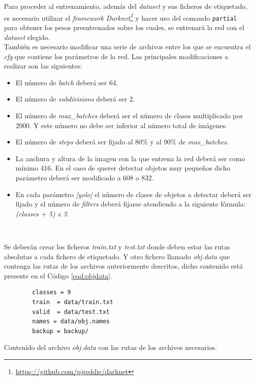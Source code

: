 Para proceder al entrenamiento, además del \textit{dataset} y sus ficheros de etiquetado, es necesario utilizar el \textit{framework} \textit{Darknet\footnote{\url{https://github.com/pjreddie/darknet}}} y hacer uso del comando \verb|partial| para obtener los pesos preentrenados sobre los cuales, se entrenará la red con el \textit{dataset} elegido.\\

También es necesario modificar una serie de archivos entre los que se encuentra el \textit{cfg} que contiene los parámetros de la red. Las principales modificaciones a realizar son las siguientes:
\begin{itemize}
	\item El número de \textit{batch} deberá ser 64.
	\item El número de \textit{subdivisions} deberá ser 2.
	\item El número de \textit{max\_batches} deberá ser el número de clases multiplicado por 2000. Y este número no debe ser inferior al número total de imágenes.
	\item El número de \textit{steps} deberá ser fijado al 80\% y al 90\% de \textit{max\_batches}.
	\item La anchura y altura de la imagen con la que entrena la red deberá ser como mínimo 416. En el caso de querer detectar objetos muy pequeños dicho parámetro deberá ser modificado a 608 o 832.
	\item En cada parámetro \textit{[yolo]} el número de clases de objetos a detectar deberá ser fijado y el número de \textit{filters} deberá fijarse atendiendo a la siguiente fórmula: \textit{(classes + 5) x 3}.
\end{itemize}\

Se deberán crear los ficheros \textit{train.txt} y \textit{test.txt} donde deben estar las rutas absolutas a cada fichero de etiquetado. Y otro fichero llamado \textit{obj.data} que contenga las rutas de los archivos anteriormente descritos, dicho contenido está presente en el Código \ref{cod:objdata}.\\

\begin{code}[h]
	\begin{lstlisting}
		classes = 9
		train  = data/train.txt
		valid  = data/test.txt
		names = data/obj.names
		backup = backup/
	\end{lstlisting}
	\caption[Contenido del archivo \textit{obj.data} con las rutas de los archivos necesarios.]{Contenido del archivo \textit{obj.data} con las rutas de los archivos necesarios.}
	\label{cod:objdata}
\end{code}

